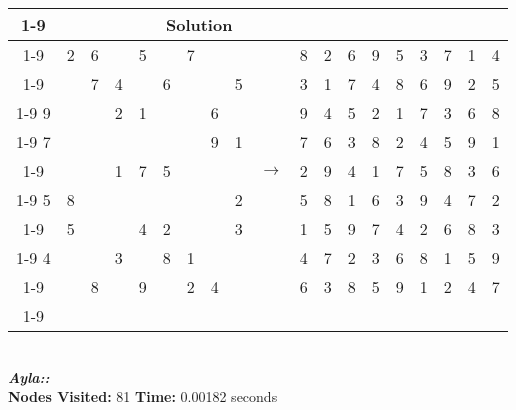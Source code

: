 \documentclass{article}
\begin{document}
\begin{tabular}{||c|c|c||c|c|c||c|c|c|| c ||c|c|c||c|c|c||c|c|c||}
  \cmidrule{1-9} \cmidrule{11-19}
  \multicolumn{9}{|c|}{Problem} &                   & \multicolumn{9}{|c|}{Solution}   \\\cmidrule{1-9} \cmidrule{11-19} \morecmidrules \cmidrule{1-9} \cmidrule{11-19}
  & 2 & 6 &   & 5 &   & 7 &   &   &  & 8 & 2 & 6 & 9 & 5 & 3 & 7 & 1 & 4\\\cmidrule{1-9} \cmidrule{11-19}
  &   & 7 & 4 &   & 6 &   &   & 5 &  & 3 & 1 & 7 & 4 & 8 & 6 & 9 & 2 & 5\\\cmidrule{1-9} \cmidrule{11-19}
9 &   &   & 2 & 1 &   &   & 6 &   &  & 9 & 4 & 5 & 2 & 1 & 7 & 3 & 6 & 8\\\cmidrule{1-9} \cmidrule{11-19} \morecmidrules \cmidrule{1-9} \cmidrule{11-19}
7 &   &   &   &   &   &   & 9 & 1 &  & 7 & 6 & 3 & 8 & 2 & 4 & 5 & 9 & 1\\\cmidrule{1-9} \cmidrule{11-19}
  &   &   & 1 & 7 & 5 &   &   &   & $\rightarrow$ & 2 & 9 & 4 & 1 & 7 & 5 & 8 & 3 & 6\\\cmidrule{1-9} \cmidrule{11-19}
5 & 8 &   &   &   &   &   &   & 2 &  & 5 & 8 & 1 & 6 & 3 & 9 & 4 & 7 & 2\\\cmidrule{1-9} \cmidrule{11-19} \morecmidrules \cmidrule{1-9} \cmidrule{11-19}
  & 5 &   &   & 4 & 2 &   &   & 3 &  & 1 & 5 & 9 & 7 & 4 & 2 & 6 & 8 & 3\\\cmidrule{1-9} \cmidrule{11-19}
4 &   &   & 3 &   & 8 & 1 &   &   &  & 4 & 7 & 2 & 3 & 6 & 8 & 1 & 5 & 9\\\cmidrule{1-9} \cmidrule{11-19}
  &   & 8 &   & 9 &   & 2 & 4 &   &  & 6 & 3 & 8 & 5 & 9 & 1 & 2 & 4 & 7\\\cmidrule{1-9} \cmidrule{11-19} \morecmidrules \cmidrule{1-9} \cmidrule{11-19}

\end{tabular}
\\
\small\emph{\textbf{Ayla::}}\\ \textbf{Nodes Visited:} 81 \textbf{Time:} 0.00182 seconds\\
\end{document}
